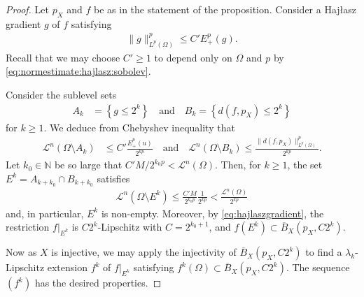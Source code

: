 \documentclass[a4paper,leqno]{amsart}
\numberwithin{equation}{section}
\theoremstyle{remark}
\theoremstyle{remark}
\newcommand{\N}{\mathbb{N}}
\newcommand{\lm}{\mathscr{L}}
\begin{document}
\begin{proof}
Let $p_X$ and $f$ be as in the statement of the proposition. Consider a Haj{\l}asz gradient $g$ of $f$ satisfying
\begin{align*}
    \| g \|_{ L^{p}( \Omega ) }^p \leq C' E^{p}_{+}(g).
\end{align*}
Recall that we may choose $C' \geq 1$ to depend only on $\Omega$ and $p$ by \eqref{eq:normestimate:hajlasz:sobolev}.

Consider the sublevel sets
\begin{align*}%
    A_k &= \left\{ g \leq 2^{k} \right\}
    \quad\text{and}\quad
    B_k = \left\{ d( f, p_X ) \leq 2^{k} \right\}
\end{align*}
for $k\geq 1$. We deduce from Chebyshev inequality that
\begin{align*}
    \lm^{n}( \Omega \setminus A_k ) &\leq C'\frac{ E^{p}_+(u) }{ 2^{kp} }
    \quad\text{and}\quad
    \lm^n( \Omega \setminus B_k ) \leq \frac{ \| d(f,p_X) \|_{ L^{p}( \Omega ) }^p }{ 2^{kp} }.
\end{align*}
Let $k_0 \in \N$ be so large that $C' M / 2^{k_0 p } < \lm^{n}(\Omega)$. Then, for $k\geq 1$, the set $E^k = A_{k+k_0} \cap B_{k+k_0}$ satisfies
\begin{align*}
    \lm^{n}( \Omega \setminus E^k )
    \leq
    \frac{ C'M }{ 2^{k_0 p} } \frac{ 1 }{ 2^{kp} }
    <
    \frac{ \lm^n( \Omega ) }{ 2^{kp} }
\end{align*}
and, in particular, $E^k$ is non-empty. Moreover, by \eqref{eq:hajlaszgradient}, the restriction $f|_{ E^{k} }$ is $C 2^{k}$-Lipschitz with $C = 2^{k_0+1}$, and $f( E^k ) \subset \overline{B}_X( p_X, C 2^{k} )$.



Now as $X$ is injective, we may apply the injectivity of $\overline{B}_{X}( p_X, C 2^{k} )$ to find a $\lambda_k$-Lipschitz extension $f^k$ of $f|_{E^{k}}$ satisfying $f^{k}( \Omega ) \subset \overline{B}_{X}( p_X, C 2^{k} )$. The sequence $( f^k )$ has the desired properties.
\end{proof}
\end{document}
